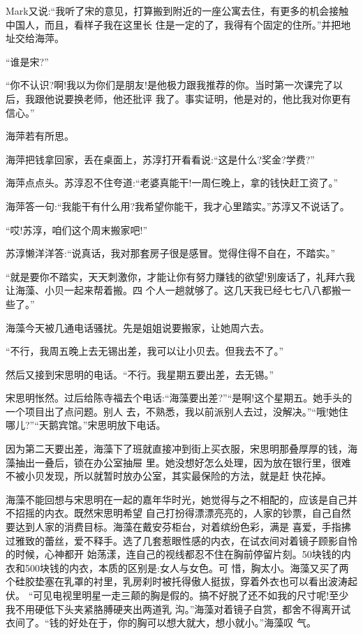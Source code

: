 \documentclass[11pt,a4paper,onecolumn]{article}
\begin{document}
Mark又说:``我听了宋的意见，打算搬到附近的一座公寓去住，有更多的机会接触中国人，而且，看样子我在这里长
住是一定的了，我得有个固定的住所。''并把地址交给海萍。

``谁是宋?''

``你不认识?啊!我以为你们是朋友!是他极力跟我推荐的你。当时第一次课完了以后，我跟他说要换老师，他还批评
我了。事实证明，他是对的，他比我对你更有信心。''

海萍若有所思。

海萍把钱拿回家，丢在桌面上，苏淳打开看看说:``这是什么?奖金?学费?''

海萍点点头。苏淳忍不住夸道:``老婆真能干!一周仨晚上，拿的钱快赶工资了。''

海萍答一句:``我能干有什么用?我希望你能干，我才心里踏实。''苏淳又不说话了。

``哎!苏淳，咱们这个周末搬家吧!''

苏淳懒洋洋答:``说真话，我对那套房子很是感冒。觉得住得不自在，不踏实。''

``就是要你不踏实，天天刺激你，才能让你有努力赚钱的欲望!别废话了，礼拜六我让海藻、小贝一起来帮着搬。四
个人一趟就够了。这几天我已经七七八八都搬一些了。''

海藻今天被几通电话骚扰。先是姐姐说要搬家，让她周六去。

``不行，我周五晚上去无锡出差，我可以让小贝去。但我去不了。''

然后又接到宋思明的电话。``不行。我星期五要出差，去无锡。''

宋思明怅然。过后给陈寺福去个电话:``海藻要出差?''``是啊!这个星期五。她手头的一个项目出了点问题。别人
去，不熟悉，我以前派别人去过，没解决。''``哦!她住哪儿?''``天鹅宾馆。''宋思明放下电话。

因为第二天要出差，海藻下了班就直接冲到街上买衣服，宋思明那叠厚厚的钱，海藻抽出一叠后，锁在办公室抽屉
里。她没想好怎么处理，因为放在银行里，很难不被小贝发现，所以就暂时放办公室，其实最保险的方法，就是赶
快花掉。

海藻不能回想与宋思明在一起的嘉年华时光，她觉得与之不相配的，应该是自己并不招摇的内衣。既然宋思明希望
自己打扮得漂漂亮亮的，人家的钞票，自己自然要达到人家的消费目标。海藻在戴安芬柜台，对着缤纷色彩，满是
喜爱，手指拂过雅致的蕾丝，爱不释手。选了几套惹眼性感的内衣，在试衣间对着镜子顾影自怜的时候，心神都开
始荡漾，连自己的视线都忍不住在胸前停留片刻。50块钱的内衣和500块钱的内衣，本质的区别是:女人与女色。可
惜，胸太小。海藻又买了两个硅胶垫塞在乳罩的衬里，乳房刹时被托得傲人挺拔，穿着外衣也可以看出波涛起伏。
``可见电视里明星一走三颠的胸是假的。搞不好脱了还不如我的尺寸呢!至少我不用硬低下头夹紧胳膊硬夹出两道乳
沟。''海藻对着镜子自赏，都舍不得离开试衣间了。``钱的好处在于，你的胸可以想大就大，想小就小。''海藻叹
气。
\end{document}
